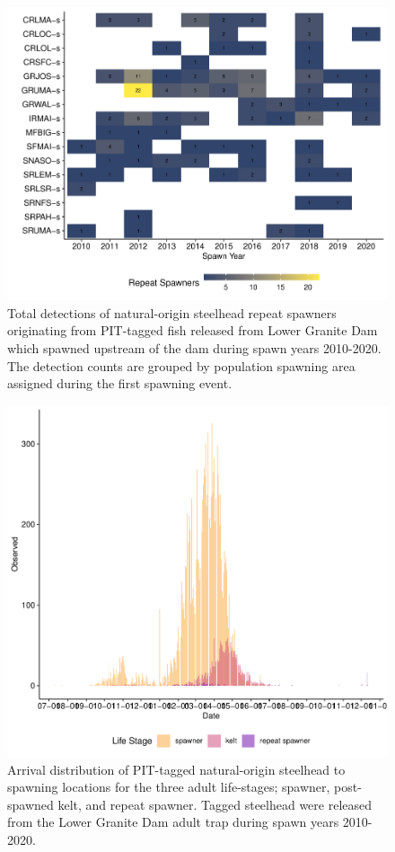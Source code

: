 \documentclass[11pt,a4paper,]{article}
\begin{document}
\begin{figure}
\centering
\includegraphics{Kelt_Summary_files/figure-latex/plot-pop-rs-1.pdf}
\caption{\label{fig:plot-pop-rs}Total detections of natural-origin steelhead repeat spawners originating from PIT-tagged fish released from Lower Granite Dam which spawned upstream of the dam during spawn years 2010-2020. The detection counts are grouped by population spawning area assigned during the first spawning event.}
\end{figure}

\begin{figure}
\centering
\includegraphics{Kelt_Summary_files/figure-latex/kelt-arrival-pop-1.pdf}
\caption{\label{fig:kelt-arrival-pop}Arrival distribution of PIT-tagged natural-origin steelhead to spawning locations for the three adult life-stages; spawner, post-spawned kelt, and repeat spawner. Tagged steelhead were released from the Lower Granite Dam adult trap during spawn years 2010-2020.}
\end{figure}
\end{document}

